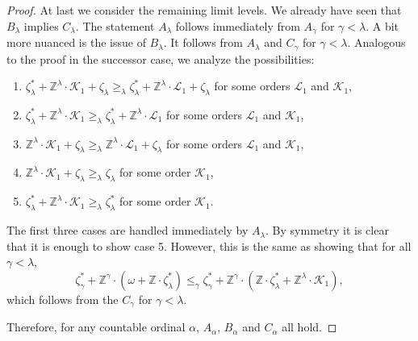 \documentclass[10pt,a4paper]{amsart}
\providecommand{\L}{\mathcal{L}}
\newcommand{\Z}{\mathbb{Z}}
\newcommand{\K}{\mathcal{K}}
\renewcommand{\L}{\mathcal{L}}
\begin{document}
\begin{proof}
At last we consider the remaining limit levels. We already have seen that
$B_\lambda$ implies $C_\lambda$. The statement $A_\lambda$ follows immediately from $A_\gamma$ for $\gamma<\lambda$. 
A bit more nuanced is the issue of $B_\lambda$. It follows from $A_\lambda$ and $C_\gamma$ for $\gamma<\lambda$.
Analogous to the proof in the successor case, we analyze the possibilities:
\begin{enumerate}
\item $\zeta^*_{\lambda} +\Z^{\lambda}\cdot
    \K_1+\zeta_{\lambda}\geq_\lambda \zeta^*_{\lambda} +\Z^{\lambda}\cdot \L_1+\zeta_{\lambda} $ for some orders $\L_1$ and $\K_1$,
\item $\zeta^*_{\lambda} +\Z^{\lambda}\cdot \K_1\geq_\lambda \zeta^*_{\lambda} +\Z^{\lambda}\cdot \L_1 $ for some orders $\L_1$ and $\K_1$,
\item $\Z^{\lambda}\cdot \K_1+\zeta_{\lambda}\geq_\lambda \Z^{\lambda}\cdot \L_1+\zeta_{\lambda} $ for some orders $\L_1$ and $\K_1$,
\item $\Z^{\lambda}\cdot \K_1+\zeta_{\lambda}\geq_\lambda \zeta_{\lambda} $ for some order $\K_1$,
\item $\zeta^*_{\lambda} +\Z^{\lambda}\cdot \K_1\geq_\lambda\zeta^*_{\lambda} $ for some order $\K_1$.
\end{enumerate}

The first three cases are handled immediately by $A_{\lambda}$. By symmetry it is clear that it is enough to show case 5. However, this is the same as showing that for all $\gamma<\lambda$,
$$\zeta_{\gamma}^* + \Z^\gamma\cdot(\omega +  \Z\cdot\zeta_{\lambda}^*)
\leq_{\gamma}\zeta_{\gamma}^* + \Z^{\gamma}\cdot
(\Z\cdot\zeta_{\lambda}^*+\Z^\lambda\cdot \K_1),$$
which follows from the $C_\gamma$ for $\gamma<\lambda$.

Therefore, for any countable ordinal $\alpha$, $A_\alpha$, $B_\alpha$ and $C_\alpha$ all hold.
\end{proof}
\end{document}
